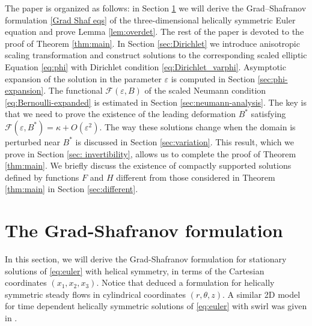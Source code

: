 \documentclass[12pt,reqno]{amsart}
\numberwithin{equation}{section}
\theoremstyle{definition}
\theoremstyle{remark}
\begin{document}
The paper is organized as follows: in Section \ref{sec:Grad} we will derive the Grad--Shafranov formulation \eqref{Grad Shaf eqs} of the three-dimensional helically symmetric Euler equation and prove Lemma \ref{lem:overdet}. The rest of the paper is devoted to the proof of Theorem \ref{thm:main}.
In Section \ref{sec:Dirichlet} we introduce anisotropic scaling transformation and construct solutions to the corresponding  scaled elliptic Equation \eqref{eq:phi} with Dirichlet condition \eqref{eq:Dirichlet_varphi}. 
Asymptotic expansion of the solution in the parameter $\varepsilon$ is computed in Section
\ref{sec:phi-expansion}. The  functional $ \mathcal{F}(\varepsilon,B) $ of the scaled Neumann condition \eqref{eq:Bernoulli-expanded} is estimated in Section \ref{sec:neumann-analysis}. The key is that we need to prove the existence of  the leading deformation $ B^* $ satisfying $ \mathcal{F}(\varepsilon,B^*)=\kappa+O(\varepsilon^2) $. %
The way these solutions change when the domain is perturbed near $ B^* $  is
discussed in Section \ref{sec:variation}.  This result, which we prove in Section \ref{sec: invertibility}, allows us to
complete the proof of Theorem \ref{thm:main}. We briefly discuss the existence of compactly supported solutions defined by functions $ F $ and $ H $ different from those considered in Theorem \ref{thm:main} in Section \ref{sec:different}. 



 

 




 


  

 

\section{The Grad-Shafranov formulation}\label{sec:Grad}
In this section, we will derive the Grad-Shafranov formulation for stationary solutions of \eqref{eq:euler} with helical symmetry, in terms of the Cartesian coordinates $ (x_1,x_2,x_3) $.  Notice that \cite{GavrilovHelical} deduced a formulation for helically symmetric steady flows in cylindrical coordinates $ (r,\theta,z) $. A similar 2D model for time dependent helically symmetric solutions of \eqref{eq:euler} with swirl was given in \cite{QinWan}. %
\end{document}
